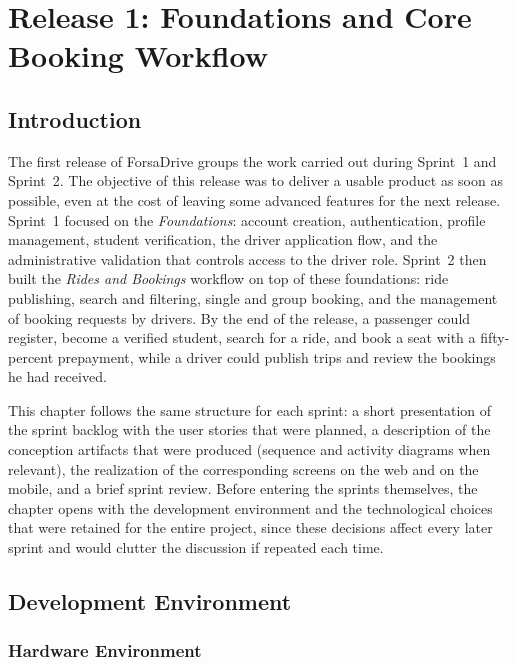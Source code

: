 \chapter{Release 1: Foundations and Core Booking Workflow}

\clearpage
\section*{Introduction}

The first release of ForsaDrive groups the work carried out during Sprint~1 and Sprint~2. The objective of this release was to deliver a usable product as soon as possible, even at the cost of leaving some advanced features for the next release. Sprint~1 focused on the \textit{Foundations}: account creation, authentication, profile management, student verification, the driver application flow, and the administrative validation that controls access to the driver role. Sprint~2 then built the \textit{Rides and Bookings} workflow on top of these foundations: ride publishing, search and filtering, single and group booking, and the management of booking requests by drivers. By the end of the release, a passenger could register, become a verified student, search for a ride, and book a seat with a fifty-percent prepayment, while a driver could publish trips and review the bookings he had received.

This chapter follows the same structure for each sprint: a short presentation of the sprint backlog with the user stories that were planned, a description of the conception artifacts that were produced (sequence and activity diagrams when relevant), the realization of the corresponding screens on the web and on the mobile, and a brief sprint review. Before entering the sprints themselves, the chapter opens with the development environment and the technological choices that were retained for the entire project, since these decisions affect every later sprint and would clutter the discussion if repeated each time.

\section{Development Environment}

\subsection{Hardware Environment}

